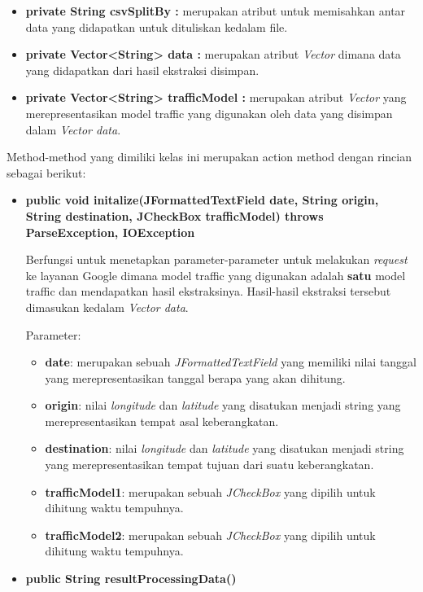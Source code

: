 \begin{enumerate}
	\begin{itemize}
		\item \textbf{private String csvSplitBy :} merupakan atribut untuk memisahkan antar data yang didapatkan untuk dituliskan kedalam file.
		\item \textbf{private Vector<String> data :} merupakan atribut \textit{Vector} dimana data yang didapatkan dari hasil ekstraksi disimpan.
		\item \textbf{private Vector<String> trafficModel :} merupakan atribut \textit{Vector} yang merepresentasikan model traffic yang digunakan oleh data yang disimpan dalam \textit{Vector data}.
	\end{itemize}
	
	Method-method yang dimiliki kelas ini merupakan action method dengan rincian sebagai berikut:
	
	\begin{itemize}
		\item \textbf{public void initalize(JFormattedTextField date, String origin, String destination, JCheckBox trafficModel) throws ParseException, IOException} 
		
		Berfungsi untuk menetapkan parameter-parameter untuk melakukan \textit{request} ke layanan Google dimana model traffic yang digunakan adalah \textbf{satu} model traffic dan mendapatkan hasil ekstraksinya. Hasil-hasil ekstraksi tersebut dimasukan kedalam \textit{Vector data}.
		
		Parameter:
	\begin{itemize}
		\item \textbf{date}: merupakan sebuah \textit{JFormattedTextField} yang memiliki nilai tanggal yang merepresentasikan tanggal berapa yang akan dihitung. 
		\item \textbf{origin}: nilai \textit{longitude} dan \textit{latitude} yang disatukan menjadi string yang merepresentasikan tempat asal keberangkatan.
		\item \textbf{destination}: nilai \textit{longitude} dan \textit{latitude} yang disatukan menjadi string yang merepresentasikan tempat tujuan dari suatu keberangkatan.
		\item \textbf{trafficModel1}: merupakan sebuah \textit{JCheckBox} yang dipilih untuk dihitung waktu tempuhnya.
		\item \textbf{trafficModel2}: merupakan sebuah \textit{JCheckBox} yang dipilih untuk dihitung waktu tempuhnya.
	\end{itemize}
		
		\item \textbf{public String resultProcessingData()}
		

\end{itemize}
\end{enumerate}
